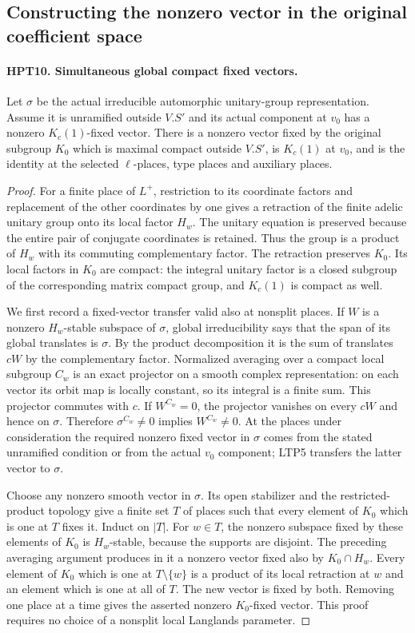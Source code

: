 \subsection{Constructing the nonzero vector in the original coefficient space}

\paragraph{HPT10. Simultaneous global compact fixed vectors.}
\label{claim:HPT10}
Let $\sigma$ be the actual irreducible automorphic unitary-group
representation.  Assume it is unramified outside $V.S'$ and its
actual component at $v_0$ has a nonzero $K_c(1)$-fixed vector.
There is a nonzero vector fixed by the original subgroup $K_0$
which is maximal compact outside $V.S'$, is $K_c(1)$ at $v_0$,
and is the identity at the selected $\ell$-places, type places
and auxiliary places.
\begin{proof}
For a finite place of $L^+$, restriction to its coordinate factors
and replacement of the other coordinates by one gives a retraction
of the finite adelic unitary group onto its local factor $H_w$.
The unitary equation is preserved because the entire pair of
conjugate coordinates is retained.  Thus the group is a product
of $H_w$ with its commuting complementary factor.  The retraction
preserves $K_0$.  Its local factors in $K_0$ are compact: the
integral unitary factor is a closed subgroup of the corresponding
matrix compact group, and $K_c(1)$ is compact as well.

We first record a fixed-vector transfer valid also at nonsplit
places.  If $W$ is a nonzero $H_w$-stable subspace of $\sigma$,
global irreducibility says that the span of its global translates
is $\sigma$.  By the product decomposition it is the sum of
translates $cW$ by the complementary factor.  Normalized averaging
over a compact local subgroup $C_w$ is an exact projector on a
smooth complex representation: on each vector its orbit map is
locally constant, so its integral is a finite sum.  This projector
commutes with $c$.  If $W^{C_w}=0$, the projector vanishes on every
$cW$ and hence on $\sigma$.  Therefore $\sigma^{C_w}\ne0$
implies $W^{C_w}\ne0$.  At the places under consideration the
required nonzero fixed vector in $\sigma$ comes from the stated
unramified condition or from the actual $v_0$ component; LTP5
transfers the latter vector to $\sigma$.

Choose any nonzero smooth vector in $\sigma$.  Its open stabilizer
and the restricted-product topology give a finite set $T$ of
places such that every element of $K_0$ which is one at $T$ fixes
it.  Induct on $|T|$.  For $w\in T$, the nonzero subspace fixed
by these elements of $K_0$ is $H_w$-stable, because the supports
are disjoint.  The preceding averaging argument produces in it
a nonzero vector fixed also by $K_0\cap H_w$.  Every element of
$K_0$ which is one at $T\setminus\{w\}$ is a product of its
local retraction at $w$ and an element which is one at all of $T$.
The new vector is fixed by both.  Removing one place at a time
gives the asserted nonzero $K_0$-fixed vector.  This proof requires
no choice of a nonsplit local Langlands parameter.
\end{proof}

